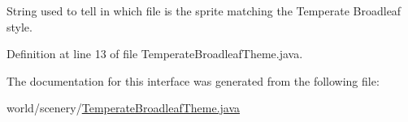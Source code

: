 String used to tell in which file is the sprite matching the Temperate Broadleaf style. 



Definition at line 13 of file Temperate\-Broadleaf\-Theme.\-java.



The documentation for this interface was generated from the following file\-:\begin{DoxyCompactItemize}
\item 
world/scenery/\hyperlink{_temperate_broadleaf_theme_8java}{Temperate\-Broadleaf\-Theme.\-java}\end{DoxyCompactItemize}
